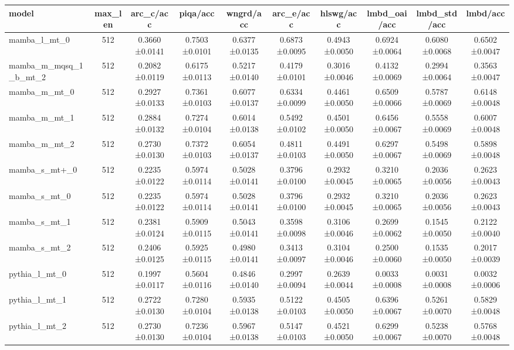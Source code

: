 \begin{tabular}{lccccccccc}
\toprule
model & max\_len & arc\_c/acc & piqa/acc & wngrd/acc & arc\_e/acc & hlswg/acc & lmbd\_oai/acc & lmbd\_std/acc & lmbd/acc \\
\midrule
mamba\_l\_mt\_0 & 512 & 0.3660 ±0.0141 & 0.7503 ±0.0101 & 0.6377 ±0.0135 & 0.6873 ±0.0095 & 0.4943 ±0.0050 & 0.6924 ±0.0064 & 0.6080 ±0.0068 & 0.6502 ±0.0047 \\
mamba\_m\_mqsq\_1\_b\_mt\_2 & 512 & 0.2082 ±0.0119 & 0.6175 ±0.0113 & 0.5217 ±0.0140 & 0.4179 ±0.0101 & 0.3016 ±0.0046 & 0.4132 ±0.0069 & 0.2994 ±0.0064 & 0.3563 ±0.0047 \\
mamba\_m\_mt\_0 & 512 & 0.2927 ±0.0133 & 0.7361 ±0.0103 & 0.6077 ±0.0137 & 0.6334 ±0.0099 & 0.4461 ±0.0050 & 0.6509 ±0.0066 & 0.5787 ±0.0069 & 0.6148 ±0.0048 \\
mamba\_m\_mt\_1 & 512 & 0.2884 ±0.0132 & 0.7274 ±0.0104 & 0.6014 ±0.0138 & 0.5492 ±0.0102 & 0.4501 ±0.0050 & 0.6456 ±0.0067 & 0.5558 ±0.0069 & 0.6007 ±0.0048 \\
mamba\_m\_mt\_2 & 512 & 0.2730 ±0.0130 & 0.7372 ±0.0103 & 0.6054 ±0.0137 & 0.4811 ±0.0103 & 0.4491 ±0.0050 & 0.6297 ±0.0067 & 0.5498 ±0.0069 & 0.5898 ±0.0048 \\
mamba\_s\_mt+\_0 & 512 & 0.2235 ±0.0122 & 0.5974 ±0.0114 & 0.5028 ±0.0141 & 0.3796 ±0.0100 & 0.2932 ±0.0045 & 0.3210 ±0.0065 & 0.2036 ±0.0056 & 0.2623 ±0.0043 \\
mamba\_s\_mt\_0 & 512 & 0.2235 ±0.0122 & 0.5974 ±0.0114 & 0.5028 ±0.0141 & 0.3796 ±0.0100 & 0.2932 ±0.0045 & 0.3210 ±0.0065 & 0.2036 ±0.0056 & 0.2623 ±0.0043 \\
mamba\_s\_mt\_1 & 512 & 0.2381 ±0.0124 & 0.5909 ±0.0115 & 0.5043 ±0.0141 & 0.3598 ±0.0098 & 0.3106 ±0.0046 & 0.2699 ±0.0062 & 0.1545 ±0.0050 & 0.2122 ±0.0040 \\
mamba\_s\_mt\_2 & 512 & 0.2406 ±0.0125 & 0.5925 ±0.0115 & 0.4980 ±0.0141 & 0.3413 ±0.0097 & 0.3104 ±0.0046 & 0.2500 ±0.0060 & 0.1535 ±0.0050 & 0.2017 ±0.0039 \\
pythia\_l\_mt\_0 & 512 & 0.1997 ±0.0117 & 0.5604 ±0.0116 & 0.4846 ±0.0140 & 0.2997 ±0.0094 & 0.2639 ±0.0044 & 0.0033 ±0.0008 & 0.0031 ±0.0008 & 0.0032 ±0.0006 \\
pythia\_l\_mt\_1 & 512 & 0.2722 ±0.0130 & 0.7280 ±0.0104 & 0.5935 ±0.0138 & 0.5122 ±0.0103 & 0.4505 ±0.0050 & 0.6396 ±0.0067 & 0.5261 ±0.0070 & 0.5829 ±0.0048 \\
pythia\_l\_mt\_2 & 512 & 0.2730 ±0.0130 & 0.7236 ±0.0104 & 0.5967 ±0.0138 & 0.5147 ±0.0103 & 0.4521 ±0.0050 & 0.6299 ±0.0067 & 0.5238 ±0.0070 & 0.5768 ±0.0048 \\

\end{tabular}
